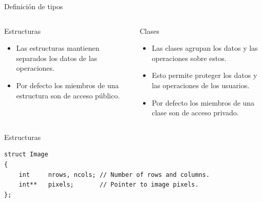 \documentclass[aspectratio=169,presentation]{beamer}
\begin{document}
\begin{frame}[label={sec:org35f42d3}]{Definición de tipos}
\begin{columns}
\begin{column}{0.48\columnwidth}
\begin{block}{Estructuras}
\begin{itemize}
\item Las estructuras mantienen separados los datos de las operaciones.

\item Por defecto los miembros de una estructura son de acceso público.
\end{itemize}
\end{block}
\end{column}
\begin{column}{0.48\columnwidth}
\begin{block}{Clases}
\begin{itemize}
\item Las clases agrupan los datos y las operaciones sobre estos.

\item Esto permite proteger los datos y las operaciones de los usuarios.

\item Por defecto los miembros de una clase son de acceso privado.
\end{itemize}
\end{block}
\end{column}
\end{columns}
\end{frame}
\begin{frame}[label={sec:org6465500},fragile]{Estructuras}
 \begin{verbatim}
struct Image
{
	int     nrows, ncols; // Number of rows and columns.
	int**   pixels;       // Pointer to image pixels.
};
\end{verbatim}
\end{frame}
\end{document}

